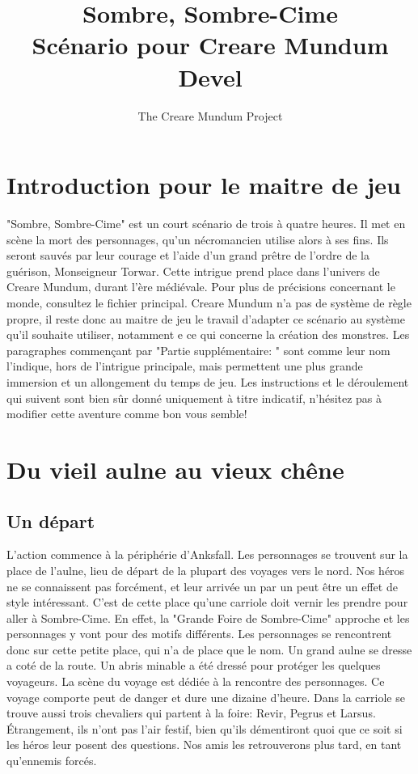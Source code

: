 \documentclass[a4paper]{article}
\title{Sombre, Sombre-Cime\\ Scénario pour Creare Mundum \\ Devel}
\author{The Creare Mundum Project}
\date{\oldstylenums{\insertdate}}
\begin{document}
\maketitle
\setcounter{tocdepth}{1} %
\renewcommand{\contentsname}{Sommaire} 
\tableofcontents
\newpage

\section{Introduction pour le maitre de jeu}
"Sombre, Sombre-Cime" est un court scénario de trois à quatre heures. Il met en scène la mort des personnages, qu'un nécromancien utilise alors à ses fins. Ils seront sauvés par leur courage et l'aide d'un grand prêtre de l'ordre de la guérison, Monseigneur Torwar.
\newline
Cette intrigue prend place dans l'univers de Creare Mundum, durant l'ère médiévale. Pour plus de précisions concernant le monde, consultez le fichier principal.
\newline
Creare Mundum n'a pas de système de règle propre, il reste donc au maitre de jeu le travail d'adapter ce scénario au système qu'il souhaite utiliser, notamment e ce qui concerne la création des monstres.
\newline
Les paragraphes commençant par "Partie supplémentaire: " sont comme leur nom l'indique, hors de l'intrigue principale, mais permettent une plus grande immersion et un allongement du temps de jeu.
\newline
Les instructions et le déroulement qui suivent sont bien sûr donné uniquement à titre indicatif, n'hésitez pas à modifier cette aventure comme bon vous semble!

\section{Du vieil aulne au vieux chêne}
\subsection{Un départ}
L'action commence à la périphérie d'Anksfall. Les personnages se trouvent sur la place de l’aulne, lieu de départ de la plupart des voyages vers le nord. Nos héros ne se connaissent pas forcément, et leur arrivée un par un peut être un effet de style intéressant. C'est de cette place qu'une carriole doit vernir les prendre pour aller à Sombre-Cime. En effet, la "Grande Foire de Sombre-Cime" approche et les personnages y vont pour des motifs différents. Les personnages  se rencontrent donc sur cette petite place, qui n'a de place que le nom. Un grand aulne se dresse a coté de la route. Un abris minable a été dressé pour protéger les quelques voyageurs. La scène du voyage est dédiée à la rencontre des personnages. Ce voyage comporte peut de danger et dure une dizaine d'heure. Dans la carriole se trouve aussi trois chevaliers qui partent à la foire: Revir, Pegrus et Larsus. Étrangement, ils n'ont pas l'air festif, bien qu'ils démentiront quoi que ce soit si les héros leur posent des questions. Nos amis les retrouverons plus tard, en tant qu'ennemis forcés.
\end{document}
